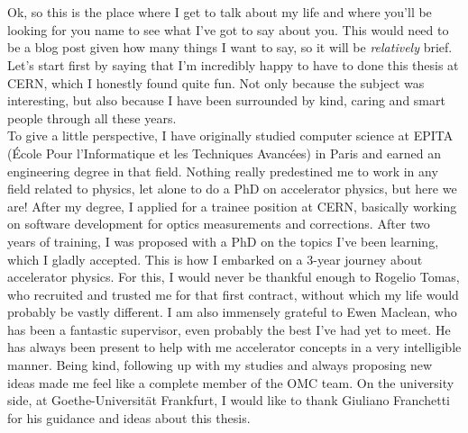 \chapter{}

Ok, so this is the place where I get to talk about my life and where you'll be looking for you name
to see what I've got to say about you. This would need to be a blog post given how many things I
want to say, so it will be \textit{relatively} brief.
Let's start first by saying that I'm incredibly happy to have to done this thesis at CERN, which I
honestly found quite fun. Not only because the subject was interesting, but also because I have been
surrounded by kind, caring and smart people through all these years.\\
\indent
To give a little perspective, I have originally studied computer science at EPITA (École Pour
l'Informatique et les Techniques Avancées) in Paris and earned an engineering degree in that field.
Nothing really predestined me to work in any field related to physics, let alone to do a PhD on 
accelerator physics, but here we are! After my degree, I applied for a trainee position at CERN, 
basically working on software development for optics measurements and corrections. After two years
of training, I was proposed with a PhD on the topics I've been learning, which I gladly accepted.
This is how I embarked on a 3-year journey about accelerator physics. For this, I would never be 
thankful enough to Rogelio Tomas, who recruited and trusted me for that first contract, without
which my life would probably be vastly different.
I am also immensely grateful to Ewen Maclean, who has been a fantastic supervisor, even probably the
best I've had yet to meet. He has always been present to help with me accelerator concepts in a very
intelligible manner. Being kind, following up with my studies and always proposing new ideas made me
feel like a complete member of the OMC team. On the university side, at Goethe-Universität
Frankfurt, I would like to thank Giuliano Franchetti for his guidance and ideas about this thesis.

